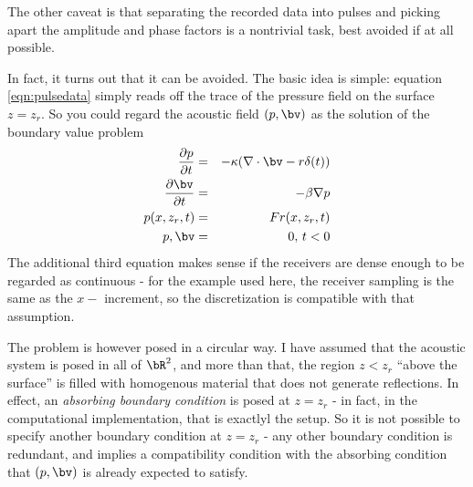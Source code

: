 The other caveat is that separating the recorded data into pulses and picking apart the amplitude and phase factors is a nontrivial task, best avoided if at all possible.

In fact, it turns out that it can be avoided. The basic idea is simple: equation \ref{eqn:pulsedata} simply reads off the trace of the pressure field on the surface $z = z_r$. So you could regard the acoustic field $(p,\bv)$ as the solution of the boundary value problem
\begin{eqnarray}
\label{eqn:vdawerdir0}
\frac{\partial p}{\partial t}&=& -\kappa (\nabla \cdot \bv - r \delta(t)) \nonumber \\
\frac{\partial \bv}{\partial t} &=& -\beta \nabla p\nonumber \\
p(x,z_r,t) &= &Fr(x,z_r,t) \nonumber \\
p,\bv & = & 0, \,t<0 
\end{eqnarray}
The additional third equation makes sense if the receivers are dense enough to be regarded as continuous - for the example used here, the receiver sampling is the same as the $x-$ increment, so the discretization is compatible with that assumption.

The problem \label{eqn:vdawerdir0} is however posed in a circular way. I have assumed that the acoustic system is posed in all of $\bR^2$, and more than that, the region $z<z_r$ ``above the surface'' is filled with homogenous material that does not generate reflections. In effect, an {\em absorbing boundary condition} is posed at $z=z_r$ - in fact, in the computational implementation, that is exactlyl the setup. So it is not possible to specify another boundary condition at $z=z_r$ - any other boundary condition is redundant, and implies a compatibility condition with the absorbing condition that $(p,\bv)$ is already expected to satisfy.

